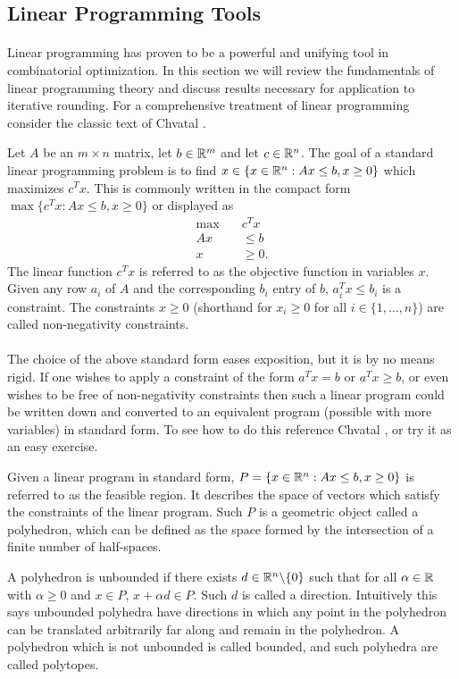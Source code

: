 \subsection{Linear Programming Tools}\label{IR:LP}
\paragraph{}
Linear programming has proven to be a powerful and unifying tool in combinatorial optimization. In this section we will review the fundamentals of linear programming theory and discuss results necessary for application to iterative rounding. For a comprehensive treatment of linear programming consider the classic text of Chvatal \cite{chvatal1983linear}.
\begin{definition}
Let $A$ be an $m \times n$ matrix, let $b \in \mathbb{R}^m$ and let $c \in \mathbb{R}^n$. The goal of a standard linear programming problem is to find $x \in \{x \in \mathbb{R}^n : Ax \leq b, x \geq 0 \}$ which maximizes $c^Tx$. This is commonly written in the compact form $\max\{c^Tx : Ax \leq b, x \geq 0 \}$ or displayed as
\begin{align*}
\max\quad &c^Tx \\
Ax &\leq b \\
x &\geq 0.
\end{align*}
The linear function $c^Tx$ is referred to as the objective function in variables $x$. Given any row $a_i$ of $A$ and the corresponding $b_i$ entry of $b$, $a_i^Tx \leq b_i$ is a constraint. The constraints $x \geq 0$ (shorthand for $x_i \geq 0$ for all $i \in \{1, \dots, n\}$) are called non-negativity constraints. 
\end{definition}
\paragraph{}The choice of the above standard form eases exposition, but it is by no means rigid. If one wishes to apply a constraint of the form $a^T x = b$ or $a^T x \geq b$, or even wishes to be free of non-negativity constraints then such a linear program could be written down and converted to an equivalent program (possible with more variables) in standard form. To see how to do this reference Chvatal \cite{chvatal1983linear}, or try it as an easy exercise.
\begin{definition} Given a linear program in standard form, $P = \{ x \in \mathbb{R}^n: Ax \leq b, x \geq 0 \}$ is referred to as the feasible region. It describes the space of vectors which satisfy the constraints of the linear program. Such $P$ is a geometric object called a polyhedron, which can be defined as the space formed by the intersection of a finite number of half-spaces.
\end{definition}
\begin{definition}
 A polyhedron is unbounded if there exists $d \in \mathbb{R}^n\backslash \{0\}$ such that for all $\alpha \in \mathbb{R}$ with $\alpha \geq 0$ and $x \in P$, $x + \alpha d \in P$. Such $d$ is called a direction. Intuitively this says unbounded polyhedra have directions in which any point in the polyhedron can be translated arbitrarily far along and remain in the polyhedron. A polyhedron which is not unbounded is called bounded, and such polyhedra are called polytopes. 
\end{definition}
